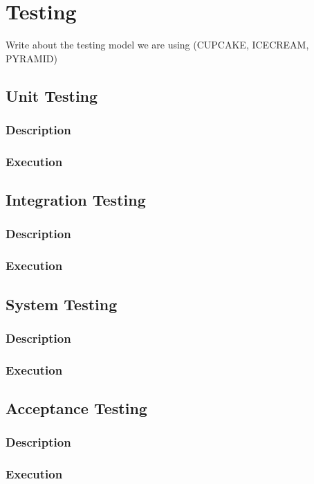 
\chapter{Testing}
Write about the testing model we are using (CUPCAKE, ICECREAM, PYRAMID)

\section{Unit Testing}
\subsection{Description}
\subsection{Execution}

\section{Integration Testing}
\subsection{Description}
\subsection{Execution}

\section{System Testing}
\subsection{Description}
\subsection{Execution}

\section{Acceptance Testing}
\subsection{Description}
\subsection{Execution}

\cleardoublepage